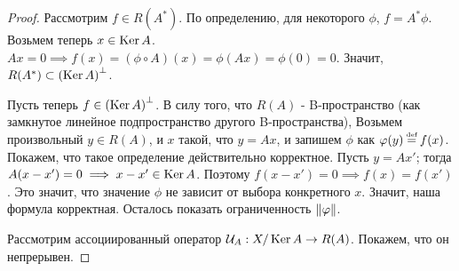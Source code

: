 \begin{proof}
    Рассмотрим $f \in R(A^*)$. По определению, для некоторого $\phi$, $f = A^*\phi$.
    Возьмем теперь $x \in \operatorname{Ker} A$. $Ax = 0 \implies f(x) = (\phi \circ A)(x) = \phi(Ax) = \phi(0) = 0$.
    Значит, $R(A^*) \subset \left( \operatorname{Ker} A\right)^\bot$.

    Пусть теперь $f \in \left( \operatorname{Ker} A\right)^\bot$. В силу того, что $R(A)$ - B-пространство
    (как замкнутое линейное подпространство другого B-пространства),
    Возьмем произвольный $y \in R(A)$, и $x$ такой, что $y = Ax$,
    и запишем $\phi$ как $\phi(y) \defeq f(x)$. Покажем, что такое определение
    действительно корректное.
    Пусть $y = Ax'$; тогда $A(x - x') = 0 \implies x - x' \in \operatorname{Ker} A$.
    Поэтому $f(x - x') = 0 \implies f(x) = f(x')$. Это значит, что значение $\phi$ не
    зависит от выбора конкретного $x$. Значит, наша формула корректная.
    Осталось показать ограниченность $\left\|\varphi\right\|$.

    Рассмотрим ассоциированный оператор
    $\mathcal{U}_A : X/\operatorname{Ker} A \rightarrow R(A)$.
    Покажем, что он непрерывен.


\end{proof}
